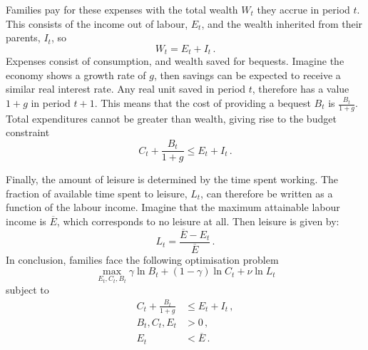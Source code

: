 Families pay for these expenses with the total wealth $W_t$ they accrue in period $t$. This consists of the income out of labour, $E_t$, and the wealth inherited from their parents, $I_t$, so
\begin{equation}
    W_t = E_t + I_t\,.
\end{equation}
Expenses consist of consumption, and wealth saved for bequests. Imagine the economy shows a growth rate of $g$, then savings can be expected to receive a similar real interest rate. Any real unit saved in period $t$, therefore has a value $1+g$ in period $t+1$. This means that the cost of providing a bequest $B_t$ is $\frac{B_t}{1+g}$. Total expenditures cannot be greater than wealth, giving rise to the budget constraint
\begin{equation}
    C_t + \frac{B_t}{1+g} \leq E_t + I_t\,.
\end{equation}

Finally, the amount of leisure is determined by the time spent working. The fraction of available time spent to leisure, $L_t$, can therefore be written as a function of the labour income. Imagine that the maximum attainable labour income is $\overline{E}$, which corresponds to no leisure at all. Then leisure is given by:
\begin{equation}
    L_t = \frac{\overline{E} - E_t}{\overline{E}}\,.
\end{equation}
In conclusion, families face the following optimisation problem
\begin{equation}
    \max_{E_t,C_t,B_t} \gamma \ln B_t + (1-\gamma) \ln C_t + \nu \ln L_t
\end{equation}
subject to
\begin{align}
      C_t + \frac{B_t}{1+g} &\leq E_t + I_t \,,\\
      B_t, C_t, E_t &>0 \,,\\
      E_t & < \overline{E}\,.
\end{align}

